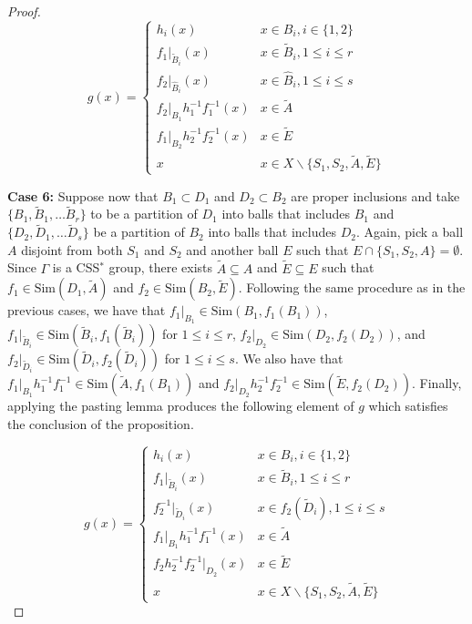 \documentclass[10pt,a4paper]{amsart}
\begin{document}
\begin{proof}
    \[ g(x) = \begin{cases} h_i(x) & x \in B_i, i\in\{1,2\}  \\
     f_1\vert_{\tilde B_i}(x) & x \in \tilde B_i, 1 \leq i \leq r\\
      f_2\vert_{\hat B_i}(x) & x \in \hat B_i, 1 \leq i \leq s\\
    f_2\vert_{B_1}h_1^{-1}f_1^{-1} (x) & x\in \tilde A\\
    f_1\vert_{B_2}h_2^{-1}f_2^{-1} (x) & x\in \tilde E\\
    x & x \in X \backslash \{S_1, S_2, \tilde A, \tilde E\}
    \end{cases}
    \]


    \noindent\textbf{Case 6:}
    Suppose now that $B_1 \subset D_1$ and $D_2 \subset B_2$ are proper inclusions and take $\{B_1, \tilde B_1, \dots \tilde B_r \}$ to be a partition of $D_1$ into balls that includes $B_1$ and $\{D_2, \tilde D_1, \dots \tilde D_s \}$ be a partition of $B_2$ into balls that includes $D_2$. Again, pick a ball $A$ disjoint from both $S_1$ and $S_2$ and another ball $E$ such that $E \cap \{S_1, S_2, A\} = \emptyset$. Since $\Gamma$ is a CSS$^*$ group, there exists $\tilde A \subseteq A$ and $\tilde E \subseteq E$ such that $f_1 \in \text{Sim}(D_1, \tilde A)$ and $f_2 \in \text{Sim}(B_2, \tilde E)$. Following the same procedure as in the previous cases, we have that $f_1\vert_{B_1} \in \text{Sim}(B_1, f_1(B_1))$,  $f_1\vert_{\tilde B_i} \in \text{Sim}(\tilde B_i, f_1(\tilde B_i))$ for $1 \leq i \leq r$, $f_2\vert_{D_2} \in \text{Sim}(D_2, f_2(D_2))$, and $f_2\vert_{\tilde D_i} \in \text{Sim}(\tilde D_i, f_2(\tilde D_i))$ for $1 \leq i \leq s$.  We also have that $f_1\vert_{B_1}h_1^{-1}f_1^{-1} \in \text{Sim}(\tilde A,f_1(B_1))$ and $f_2\vert_{D_2}h_2^{-1}f_2^{-1} \in \text{Sim}(\tilde E, f_2(D_2))$. Finally, applying the pasting lemma produces the following element of $g$ which satisfies the conclusion of the proposition.  

     \[ g(x) = \begin{cases} h_i(x) & x \in B_i, i\in\{1,2\}  \\
     f_1\vert_{\tilde B_i}(x) & x \in \tilde B_i, 1 \leq i \leq r\\
        f^{-1}_2\vert_{\tilde D_i}(x) & x \in f_2(\tilde D_i), 1 \leq i \leq s\\
    f_1\vert_{B_1}h_1^{-1}f_1^{-1} (x) & x\in \tilde A\\
    f_2h_2^{-1}f_2^{-1}\vert_{D_2} (x) & x\in \tilde E\\
    x & x \in X \backslash \{S_1, S_2, \tilde A, \tilde E\}
    \end{cases}
    \]


\end{proof}
\end{document}
